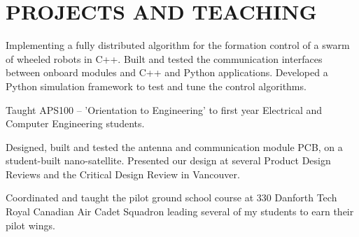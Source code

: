 \documentclass{ResumeTemplate}
\begin{document}
        \section{PROJECTS AND TEACHING}
        

        \workitemsthree
        {Implementing a fully distributed algorithm for the formation control of a swarm of wheeled robots in C++.}
        {Built and tested the communication interfaces between onboard modules and C++ and Python applications.}
        {Developed a Python simulation framework to test and tune the control algorithms. }
        

        \workitemsone
        {Taught APS100 -- 'Orientation to Engineering' to first year Electrical and Computer Engineering students.}
        

        \workitemstwo
        {Designed, built and tested the antenna and communication module PCB, on a student-built nano-satellite.}
        {Presented our design at several Product Design Reviews and the Critical Design Review in Vancouver.}

        
        \workitemsone
        {Coordinated and taught the pilot ground school course at 330 Danforth Tech Royal Canadian Air Cadet Squadron leading several of my students to earn their pilot wings.}

        
\end{document}
